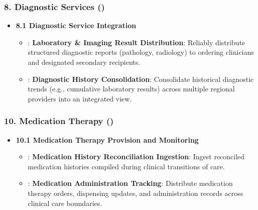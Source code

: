 \subsubsection*{8. Diagnostic Services (\texttt{})}
\label{rad:enabling:410}

\begin{itemize}

\item
\textbf{8.1 Diagnostic Service Integration}


\begin{itemize}

\item
\texttt{}: \textbf{Laboratory \& Imaging Result Distribution}: Reliably distribute structured diagnostic reports (pathology, radiology) to ordering clinicians and designated secondary recipients.



\item
\texttt{}: \textbf{Diagnostic History Consolidation}: Consolidate historical diagnostic trends (e.g., cumulative laboratory results) across multiple regional providers into an integrated view.



\end{itemize}


\end{itemize}
\label{rad:enabling:414}
\subsubsection*{10. Medication Therapy (\texttt{})}
\label{rad:enabling:415}

\begin{itemize}

\item
\textbf{10.1 Medication Therapy Provision and Monitoring}


\begin{itemize}

\item
\texttt{}: \textbf{Medication History Reconciliation Ingestion}: Ingest reconciled medication histories compiled during clinical transitions of care.



\item
\texttt{}: \textbf{Medication Administration Tracking}: Distribute medication therapy orders, dispensing updates, and administration records across clinical care boundaries.



\end{itemize}


\end{itemize}
\label{rad:enabling:419}
